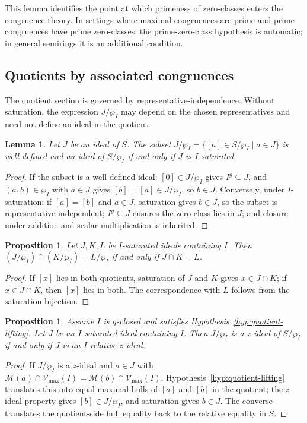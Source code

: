 \documentclass[11pt,leqno]{amsart}
\theoremstyle{plain}
\newtheorem{proposition}[theorem]{Proposition}
\newtheorem{lemma}[theorem]{Lemma}
\theoremstyle{definition}
\theoremstyle{remark}
\numberwithin{equation}{section}
\newcommand{\M}{\mathcal M}
\begin{document}
This lemma identifies the point at which primeness of zero-classes
enters the congruence theory.
In settings where maximal congruences are prime and prime congruences
have prime zero-classes, the prime-zero-class hypothesis is
automatic; in general semirings it is an additional condition.

\subsection{Quotients by associated congruences}

The quotient section is governed by representative-independence.
Without saturation, the expression $J/\wp_I$ may depend on the
chosen representatives and need not define an ideal in the quotient.

\begin{lemma}\label{app:quotient-saturation-expanded}
Let $J$ be an ideal of $S$.  The subset
$J/\wp_I=\{[a]\in S/\wp_I\mid a\in J\}$
is well-defined and an ideal of $S/\wp_I$ if and only if $J$
is $I$-saturated.
\end{lemma}
\begin{proof}
If the subset is a well-defined ideal:
$[0]\in J/\wp_I$ gives $I^g\subseteq J$,
and $(a,b)\in\wp_I$ with $a\in J$ gives $[b]=[a]\in J/\wp_I$,
so $b\in J$.
Conversely, under $I$-saturation:
if $[a]=[b]$ and $a\in J$, saturation gives $b\in J$,
so the subset is representative-independent;
$I^g\subseteq J$ ensures the zero class lies in $J$;
and closure under addition and scalar multiplication is inherited.
\end{proof}

\begin{proposition}\label{app:quotient-intersection-expanded}
Let $J,K,L$ be $I$-saturated ideals containing $I$.  Then
$(J/\wp_I)\cap(K/\wp_I)=L/\wp_I$ if and only if $J\cap K=L$.
\end{proposition}
\begin{proof}
If $[x]$ lies in both quotients, saturation of $J$ and $K$ gives
$x\in J\cap K$; if $x\in J\cap K$, then $[x]$ lies in both.
The correspondence with $L$ follows from the saturation bijection.
\end{proof}

\begin{proposition}\label{app:relative-z-quotient-expanded}
Assume $I$ is $g$-closed and satisfies
Hypothesis~\ref{hyp:quotient-lifting}.
Let $J$ be an $I$-saturated ideal containing $I$.
Then $J/\wp_I$ is a $z$-ideal of $S/\wp_I$ if and only if $J$ is
an $I$-relative $z$-ideal.
\end{proposition}
\begin{proof}
If $J/\wp_I$ is a $z$-ideal and $a\in J$ with
$\M(a)\cap\mathcal{V}_{\max}(I)=\M(b)\cap\mathcal{V}_{\max}(I)$,
Hypothesis~\ref{hyp:quotient-lifting} translates this into equal
maximal hulls of $[a]$ and $[b]$ in the quotient;
the $z$-ideal property gives $[b]\in J/\wp_I$,
and saturation gives $b\in J$.
The converse translates the quotient-side hull equality back to the
relative equality in $S$.
\end{proof}
\end{document}
